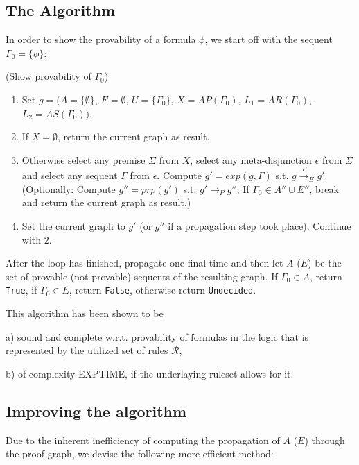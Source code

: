\documentclass{llncs}
\begin{document}
\subsection{The Algorithm}

In order to show the provability of a formula $\phi$, we start off with the sequent
$\Gamma_0=\{\phi\}$:

\begin{example}
(Show provability of $\Gamma_0$)
\begin{enumerate}
\item Set $g=(A=\{\emptyset\}$, $E=\emptyset$, $U=\{\Gamma_0\}$, $X=AP(\Gamma_0)$,
$L_1=AR(\Gamma_0)$, $L_2=AS(\Gamma_0))$.

\item If $X=\emptyset$, return the current graph as result.
\item Otherwise select any premise
$\Sigma$ from $X$, select any meta-disjunction $\epsilon$ from $\Sigma$ and select any sequent
$\Gamma$ from $\epsilon$. Compute $g'=exp(g,\Gamma)$ s.t.
$g\stackrel{\Gamma}\rightarrow_E g'$. (Optionally: Compute $g''=prp(g')$ s.t.
$g'\rightarrow_P g''$; If $\Gamma_0\in A''\cup E''$, break and return the current
graph as result.)
\item Set the current graph to $g'$ (or $g''$ if a propagation step took place). Continue with 2.
\end{enumerate}
After the loop has finished, propagate one final time and then
let $A$ ($E$) be the set of provable (not provable) sequents of the resulting
graph. If $\Gamma_0\in A$, return \verb|True|, if $\Gamma_0\in E$, return
\verb|False|, otherwise return \verb|Undecided|.
\end{example}

This algorithm has been shown to be
\begin{description}
\item{a) }sound and complete w.r.t. provability of formulas in the logic that is
represented by the utilized set of rules $\mathcal{R}$,
\item{b) }of complexity EXPTIME, if the underlaying ruleset allows for it.
\end{description}

\subsection{Improving the algorithm}

Due to the inherent inefficiency of computing the propagation of $A$
($E$) through the proof graph, we devise the following more efficient method:
\end{document}
